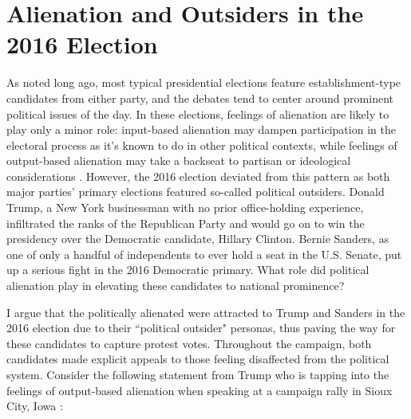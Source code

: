 \documentclass[12pt]{article}
\begin{document}




\section{Alienation and Outsiders in the 2016 Election}\label{sec:theory}
As \textcite{templeton1966} noted long ago, most typical presidential elections feature establishment-type candidates from either party, and the debates tend to center around prominent political issues of the day. In these elections, feelings of alienation are likely to play only a minor role: input-based alienation may dampen participation in the electoral process as it's known to do in other political contexts, while feelings of output-based alienation may take a backseat to partisan or ideological considerations \parencite{finifter1970dimensions}. However, the 2016 election deviated from this pattern as both major parties' primary elections featured so-called political outsiders. Donald Trump, a New York businessman with no prior office-holding experience, infiltrated the ranks of the Republican Party and would go on to win the presidency over the Democratic candidate, Hillary Clinton. Bernie Sanders, as one of only a handful of independents to ever hold a seat in the U.S. Senate, put up a serious fight in the 2016 Democratic primary. What role did political alienation play in elevating these candidates to national prominence?

I argue that the politically alienated were attracted to Trump and Sanders in the 2016 election due to their ``political outsider" personas, thus paving the way for these candidates to capture protest votes. Throughout the campaign, both candidates made explicit appeals to those feeling disaffected from the political system. Consider the following statement from Trump who is tapping into the feelings of output-based alienation when speaking at a campaign rally in Sioux City, Iowa \parencite{Jackson2016}:
\end{document}
